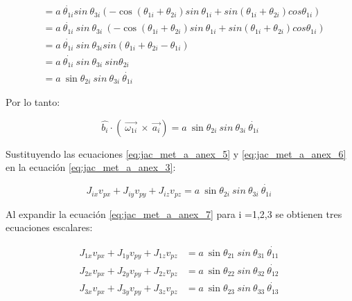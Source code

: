 \begin{align*}
                 &=a~ \dot{ \theta _{1i}}sin~ \theta _{3i} \left( -\cos  \left(  \theta _{1i}+ \theta _{2i} \right) sin~ \theta _{1i}+sin \left(  \theta _{1i}+ \theta _{2i} \right) cos  \theta _{1i} \right) \\
                 &=a~ \dot{ \theta _{1i}}~sin~ \theta _{3i}~ \left( -\cos  \left(  \theta _{1i}+ \theta _{2i} \right) sin~ \theta _{1i}+sin \left(  \theta _{1i}+ \theta _{2i} \right) cos  \theta _{1i} \right) \\
                 &=a~ \dot{ \theta _{1i}}~sin~ \theta _{3i} sin \left(  \theta _{1i}+ \theta _{2i}- \theta _{1i} \right)\\
                 &=a~ \dot{ \theta _{1i}~}sin~ \theta _{3i}~sin \theta _{2i} \\
                 &=a~ \sin  \theta _{2i}~sin~ \theta _{3i}~\dot{ \theta _{1i}}
            \end{align*}
            
            Por lo tanto:
            
            \begin{equation}
                \widehat{b_{i}} \cdot  \left( ~\overrightarrow{ \omega _{1i}}~\times~\overrightarrow{a_{i}} \right)=a~ \sin  \theta _{2i}~sin~ \theta _{3i}~\dot{ \theta _{1i}}
                                \label{eq:jac_met_a_anex_6}
            \end{equation}
            
                        \newpage

           Sustituyendo las ecuaciones \ref{eq:jac_met_a_anex_5} y \ref{eq:jac_met_a_anex_6} en la ecuación \ref{eq:jac_met_a_anex_3}:
            
            \begin{equation}
                J_{ix}v_{px}+J_{iy}v_{py}+J_{iz}v_{pz}=a~\sin  \theta _{2i}~sin~ \theta _{3i}~\dot{ \theta _{1i}}~
            \label{eq:jac_met_a_anex_7}
            \end{equation}

            
            Al expandir la ecuación \ref{eq:jac_met_a_anex_7} para i =1,2,3 se obtienen tres ecuaciones escalares:
            
            \vspace{-0.5cm}
            
            \begin{align*}
             J_{1x}v_{px}+J_{1y}v_{py}+J_{1z}v_{pz}&=a~\sin  \theta _{21}~sin~ \theta _{31}~\dot{ \theta _{11}}~ \\
             J_{2x}v_{px}+J_{2y}v_{py}+J_{2z}v_{pz}&=a~\sin  \theta _{22}~sin~ \theta _{32}~\dot{ \theta _{12}}~ \\
             J_{3x}v_{px}+J_{3y}v_{py}+J_{3z}v_{pz}&=a~\sin  \theta _{23}~sin~ \theta _{33}~\dot{ \theta _{13}}~ \\ 
            \end{align*}
            
